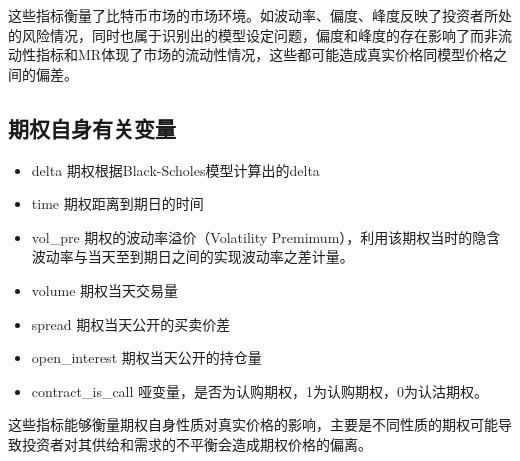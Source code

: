     这些指标衡量了比特币市场的市场环境。如波动率、偏度、峰度反映了投资者所处的风险情况，同时也属于识别出的模型设定问题，偏度和峰度的存在影响了而非流动性指标和MR体现了市场的流动性情况，这些都可能造成真实价格同模型价格之间的偏差。
    \subsection{期权自身有关变量}
    \begin{itemize}
        \item delta 期权根据Black-Scholes模型计算出的delta
        \item time 期权距离到期日的时间
        \item vol\_pre 期权的波动率溢价（Volatility Premimum），利用该期权当时的隐含波动率与当天至到期日之间的实现波动率之差计量。
        \item volume 期权当天交易量                                     
        \item spread 期权当天公开的买卖价差
        \item open\_interest 期权当天公开的持仓量
        \item contract\_is\_call 哑变量，是否为认购期权，1为认购期权，0为认沽期权。 
    \end{itemize}
    这些指标能够衡量期权自身性质对真实价格的影响，主要是不同性质的期权可能导致投资者对其供给和需求的不平衡会造成期权价格的偏离。
